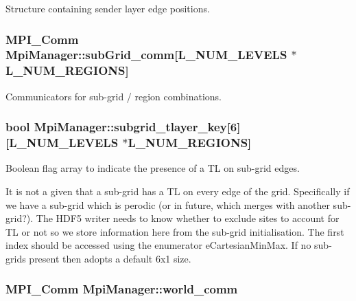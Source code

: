Structure containing sender layer edge positions. 

\subsubsection[{\texorpdfstring{sub\+Grid\+\_\+comm}{subGrid_comm}}]{\setlength{\rightskip}{0pt plus 5cm}M\+P\+I\+\_\+\+Comm Mpi\+Manager\+::sub\+Grid\+\_\+comm\mbox{[}{\bf L\+\_\+\+N\+U\+M\+\_\+\+L\+E\+V\+E\+LS} $\ast${\bf L\+\_\+\+N\+U\+M\+\_\+\+R\+E\+G\+I\+O\+NS}\mbox{]}}\hypertarget{class_mpi_manager_a0926101699de914f6be018885bea25b1}{}\label{class_mpi_manager_a0926101699de914f6be018885bea25b1}


Communicators for sub-\/grid / region combinations. 

\subsubsection[{\texorpdfstring{subgrid\+\_\+tlayer\+\_\+key}{subgrid_tlayer_key}}]{\setlength{\rightskip}{0pt plus 5cm}bool Mpi\+Manager\+::subgrid\+\_\+tlayer\+\_\+key\mbox{[}6\mbox{]}\mbox{[}{\bf L\+\_\+\+N\+U\+M\+\_\+\+L\+E\+V\+E\+LS} $\ast${\bf L\+\_\+\+N\+U\+M\+\_\+\+R\+E\+G\+I\+O\+NS}\mbox{]}}\hypertarget{class_mpi_manager_a18d53c4f9968cccec36127d33776e3d4}{}\label{class_mpi_manager_a18d53c4f9968cccec36127d33776e3d4}


Boolean flag array to indicate the presence of a TL on sub-\/grid edges. 

It is not a given that a sub-\/grid has a TL on every edge of the grid. Specifically if we have a sub-\/grid which is perodic (or in future, which merges with another sub-\/grid?). The H\+D\+F5 writer needs to know whether to exclude sites to account for TL or not so we store information here from the sub-\/grid initialisation. The first index should be accessed using the enumerator e\+Cartesian\+Min\+Max. If no sub-\/grids present then adopts a default 6x1 size. 
\subsubsection[{\texorpdfstring{world\+\_\+comm}{world_comm}}]{\setlength{\rightskip}{0pt plus 5cm}M\+P\+I\+\_\+\+Comm Mpi\+Manager\+::world\+\_\+comm}\hypertarget{class_mpi_manager_aec1ed834d1a8fa19f87499fb0d5cd332}{}\label{class_mpi_manager_aec1ed834d1a8fa19f87499fb0d5cd332}


